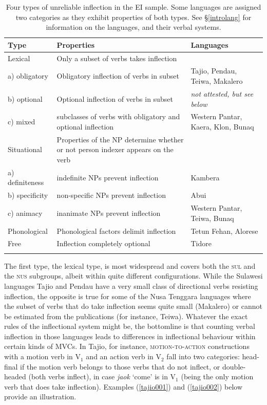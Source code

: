 \begin{table}
\begin{tabularx}{\textwidth}{l QQ}
  \lsptoprule
Type & Properties & Languages \tabularnewline 
  \midrule
Lexical & Only a subset of verbs takes inflection &  \tabularnewline
a) obligatory & Obligatory inflection of verbs in subset & Tajio, Pendau, Teiwa, Makalero \tabularnewline
b) optional & Optional inflection of verbs in subset & \textit{not attested, but see below} \tabularnewline
c) mixed & subclasses of verbs with obligatory and optional inflection & Western Pantar, Kaera, Klon, Bunaq \tabularnewline
\midrule
Situational & Properties of the NP determine whether or not person indexer appears on the verb & \tabularnewline
a) definiteness & indefinite NPs prevent inflection & Kambera \tabularnewline
b) specificity & non-specific NPs prevent inflection & Abui \tabularnewline
c) animacy & inanimate NPs prevent inflection & Western Pantar, Teiwa, Bunaq \tabularnewline
\midrule
Phonological & Phonological factors delimit inflection & Tetun Fehan, Alorese \tabularnewline
\midrule
Free & Inflection completely optional & Tidore \tabularnewline
   \lspbottomrule
\end{tabularx}
\caption[Types of unreliable inflection in EI languages]{Four types of unreliable inflection in the EI sample. Some languages are assigned two categories as they exhibit properties of both types. See §\ref{introlang} for information on the languages, and their verbal systems.}
\label{table:unreliable}
\end{table}

The first type, the lexical type, is most widespread and covers both the \textsc{sul} and the \textsc{nus} subgroups, albeit within quite different configurations. While the Sulawesi languages Tajio and Pendau have a very small class of directional verbs resisting inflection, the opposite is true for some of the Nusa Tenggara languages where the subset of verbs that do take inflection seems quite small (Makalero) or cannot be estimated from the publications (for instance, Teiwa). Whatever the exact rules of the inflectional system might be, the bottomline is that counting verbal inflection in those languages leads to differences in inflectional behaviour within certain kinds of MVCs. In Tajio, for instance, \textsc{motion-to-action} constructions with a motion verb in V$_1$ and an action verb in V$_2$  fall into two categories: head-final if the motion verb belongs to those verbs that do not inflect, or double-headed (both verbs inflect), in case \textit{jaok} `come' is in V$_1$ (being the only motion verb that does take inflection). Examples (\ref{tajio001}) and (\ref{tajio002}) below provide an illustration.

